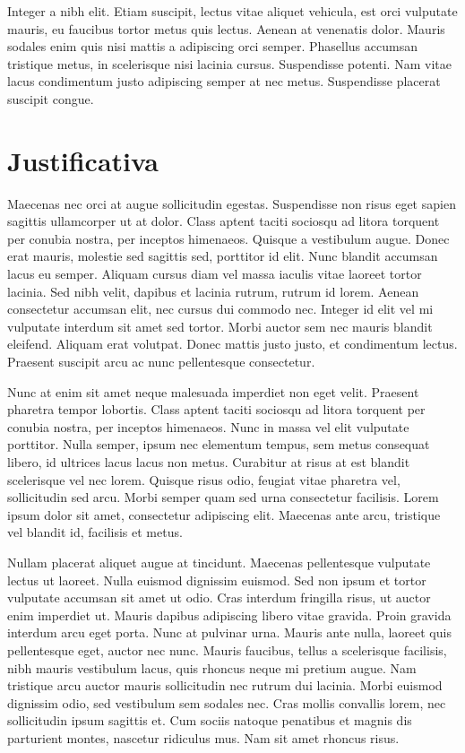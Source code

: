 Integer a nibh elit. Etiam suscipit, lectus vitae aliquet vehicula,
est orci vulputate mauris, eu faucibus tortor metus quis lectus. Aenean
at venenatis dolor. Mauris sodales enim quis nisi mattis a adipiscing
orci semper. Phasellus accumsan tristique metus, in scelerisque nisi
lacinia cursus. Suspendisse potenti. Nam vitae lacus condimentum justo
adipiscing semper at nec metus. Suspendisse placerat suscipit congue. 

\section{Justificativa}

Maecenas nec orci at augue sollicitudin egestas. Suspendisse non risus
eget sapien sagittis ullamcorper ut at dolor. Class aptent taciti
sociosqu ad litora torquent per conubia nostra, per inceptos himenaeos.
Quisque a vestibulum augue. Donec erat mauris, molestie sed sagittis
sed, porttitor id elit. Nunc blandit accumsan lacus eu semper. Aliquam
cursus diam vel massa iaculis vitae laoreet tortor lacinia. Sed nibh
velit, dapibus et lacinia rutrum, rutrum id lorem. Aenean consectetur
accumsan elit, nec cursus dui commodo nec. Integer id elit vel mi
vulputate interdum sit amet sed tortor. Morbi auctor sem nec mauris
blandit eleifend. Aliquam erat volutpat. Donec mattis justo justo,
et condimentum lectus. Praesent suscipit arcu ac nunc pellentesque
consectetur.

Nunc at enim sit amet neque malesuada imperdiet non eget velit. Praesent
pharetra tempor lobortis. Class aptent taciti sociosqu ad litora torquent
per conubia nostra, per inceptos himenaeos. Nunc in massa vel elit
vulputate porttitor. Nulla semper, ipsum nec elementum tempus, sem
metus consequat libero, id ultrices lacus lacus non metus. Curabitur
at risus at est blandit scelerisque vel nec lorem. Quisque risus odio,
feugiat vitae pharetra vel, sollicitudin sed arcu. Morbi semper quam
sed urna consectetur facilisis. Lorem ipsum dolor sit amet, consectetur
adipiscing elit. Maecenas ante arcu, tristique vel blandit id, facilisis
et metus.

Nullam placerat aliquet augue at tincidunt. Maecenas pellentesque
vulputate lectus ut laoreet. Nulla euismod dignissim euismod. Sed
non ipsum et tortor vulputate accumsan sit amet ut odio. Cras interdum
fringilla risus, ut auctor enim imperdiet ut. Mauris dapibus adipiscing
libero vitae gravida. Proin gravida interdum arcu eget porta. Nunc
at pulvinar urna. Mauris ante nulla, laoreet quis pellentesque eget,
auctor nec nunc. Mauris faucibus, tellus a scelerisque facilisis,
nibh mauris vestibulum lacus, quis rhoncus neque mi pretium augue.
Nam tristique arcu auctor mauris sollicitudin nec rutrum dui lacinia.
Morbi euismod dignissim odio, sed vestibulum sem sodales nec. Cras
mollis convallis lorem, nec sollicitudin ipsum sagittis et. Cum sociis
natoque penatibus et magnis dis parturient montes, nascetur ridiculus
mus. Nam sit amet rhoncus risus.

